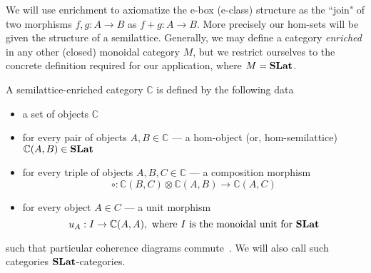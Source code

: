 We will use enrichment to axiomatize the e-box (e-class) structure as the ``join" of two morphisms $f,g: A \to B$ as $f + g: A \to B$. 
More precisely our hom-sets will be given the structure of a semilattice.
Generally,  we may define a category \textit{enriched} in any other (closed) monoidal category $M$, but we restrict ourselves to the concrete definition required for our application, where $M = \mathbf{SLat}$.

\begin{definition}
A semilattice-enriched category $\mathbb{C}$ is defined by the following data
\begin{itemize}
	\item a set of objects $\mathbb{C}$
	\item for every pair of objects $A,B \in \mathbb{C}$ --- a hom-object (or, hom-semilattice) $\mathbb{C}(A,B) \in \mathbf{SLat}$
	\item for every triple of objects $A,B,C \in \mathbb{C}$ --- a composition morphism
	\[
		\circ: \mathbb{C}(B,C) \otimes \mathbb{C}(A,B) \to \mathbb{C}(A,C)
	\]
	\item for every object $A \in C$ --- a unit morphism
	\[
	u_{A} : I \to \mathbb{C}(A,A), \text{ where $I$ is the monoidal unit for $\mathbf{SLat}$}
	\]
\end{itemize}
such that particular coherence diagrams commute~\cite{Borceux_1994}.
We will also call such categories $\mathbf{SLat}$-categories.
\end{definition}

